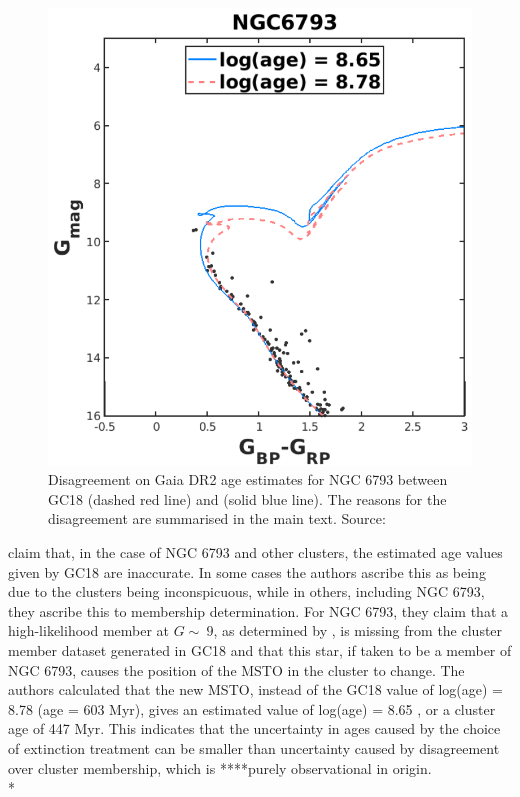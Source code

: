 \documentclass[12pt, a4paper]{report}
\begin{document}
\begin{figure}[h!]
\begin{center}
\includegraphics[width=1.0\textwidth]{bossini_ngc6793_different_age_estimate.png}
\caption{Disagreement on Gaia DR2 age estimates for NGC 6793 between GC18 (dashed red line) and \cite{2019A&A...623A.108B} (solid blue line). The reasons for the disagreement are summarised in the main text. Source:\cite{2019A&A...623A.108B}}
\label{indiv_vs_single_distance_check}
\end{center}
\end{figure}

\cite{2019A&A...623A.108B} claim that, in the case of NGC 6793 and other clusters, the estimated age values given by GC18 are inaccurate. In some cases the authors ascribe this as being due to the clusters being inconspicuous, while in others, including NGC 6793, they ascribe this to membership determination. For NGC 6793, they claim that a high-likelihood member at $G \sim\ 9$, as determined by \cite{2018A&A...618A..93C}, is missing from the cluster member dataset generated in GC18 and that this star, if taken to be a member of NGC 6793, causes the position of the MSTO in the cluster to change. The authors calculated that the new MSTO, instead of the GC18 value of log(age) = 8.78 (age = 603 Myr), gives an estimated value of log(age) = 8.65 , or a cluster age of 447 Myr. This indicates that the uncertainty in ages caused by the choice of extinction treatment can be smaller than uncertainty caused by disagreement over cluster membership, which is ****purely observational in origin. \\*
\end{document}
